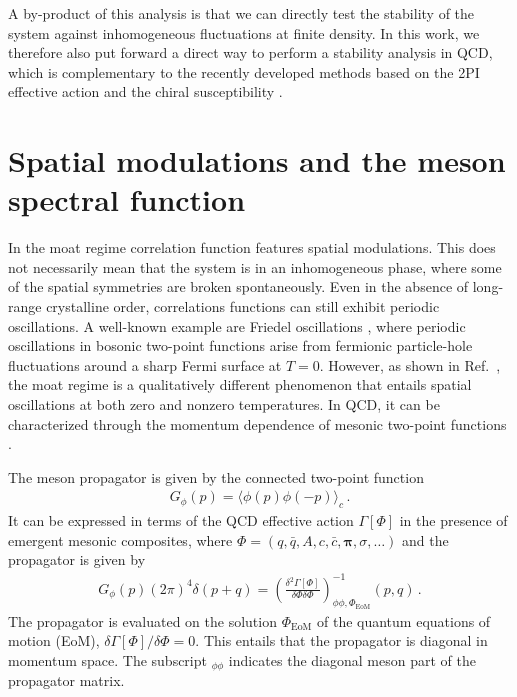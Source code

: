 \documentclass[reprint,english,superscriptaddress,preprintnumbers,amsmath,amssymb,aps,prd,nofootinbib]{revtex4-2}
\newcommand{\bs}[1]{\boldsymbol{#1}}
\begin{document}
A by-product of this analysis is that we can directly test the stability of the system against inhomogeneous fluctuations at finite density. In this work, we therefore also put forward a direct way to perform a stability analysis in QCD, which is complementary to the recently developed methods based on the 2PI effective action \cite{Motta:2024agi} and the chiral susceptibility \cite{Motta:2024rvk}. 


\section{Spatial modulations and the meson spectral function}\label{sec:spam}

In the moat regime correlation function features spatial modulations. This does not necessarily mean that the system is in an inhomogeneous phase, where some of the spatial symmetries are broken spontaneously. Even in the absence of long-range crystalline order, correlations functions can still exhibit periodic oscillations. A well-known example are Friedel oscillations \cite{fetter2012quantum, Kapusta:1988fi,DiazAlonso:1989up,Diaz-Alonso:1998eva,Liu:2007bu,Mu:2008ic}, where periodic oscillations in bosonic two-point functions arise from fermionic particle-hole fluctuations around a sharp Fermi surface at $T=0$. However, as shown in Ref.\ \cite{SYFRMoat}, the moat regime is a qualitatively different phenomenon that entails spatial oscillations at both zero and nonzero temperatures. In QCD, it can be characterized through the momentum dependence of mesonic two-point functions \cite{Fu:2019hdw}.

The meson propagator is given by the connected two-point function 
%
\begin{align}
    G_\phi(p) = \langle \phi(p)\phi(-p)\rangle_c \,. 
\label{eq:MesonProp} 
\end{align}
% 
It can be expressed in terms of the QCD effective action $\Gamma[\Phi]$ in the presence of emergent mesonic composites, where $\Phi=(q,\bar q,A,c,\bar c, \bs{\pi}, \sigma,\dots)$ and the propagator is given by 
%
\begin{align}
    G_\phi(p)(2 \pi)^4\delta(p+q) = \left(\frac{ \delta^2 \Gamma[\Phi]}{\delta\Phi\delta\Phi}\right)^{-1}_{\phi\phi,\Phi_\textrm{EoM}}(p,q)\,.
\label{eq:MesonProp} 
\end{align}
%
The propagator is evaluated on the solution $\Phi_\textrm{EoM}$ of the quantum equations of motion (EoM), $\delta\Gamma[\Phi]/\delta\Phi = 0$. This entails that the propagator is diagonal in momentum space. The subscript ${}_{\phi\phi}$ indicates the diagonal meson part of the propagator matrix. 
\end{document}
